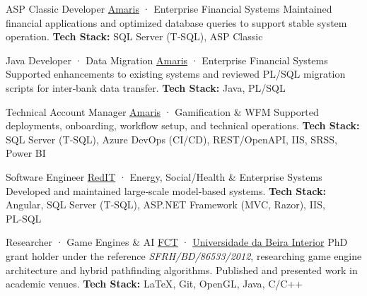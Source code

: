 \documentclass[
	a4paper,
]{fortysecondscv}
\begin{document}
\begin{cvtable}[3]
        {ASP Classic Developer}
        {\href{https://amaris.com/}{Amaris} · Enterprise Financial Systems}
        {Maintained financial applications and optimized database queries to support stable system operation.
         \newline \textbf{Tech Stack:} 
         {\color{sklimegreen}SQL Server (T‑SQL)},
         {\color{skorange}ASP Classic}}

        {Java Developer · Data Migration}
        {\href{https://amaris.com/}{Amaris} · Enterprise Financial Systems}
        {Supported enhancements to existing systems and reviewed PL/SQL migration scripts for inter‑bank data transfer.
         \newline \textbf{Tech Stack:} 
         {\color{skyellow}Java}, 
         {\color{skyellow}PL/SQL}}

        {Technical Account Manager}
        {\href{https://amaris.com/}{Amaris} · Gamification \& WFM}
        {Supported deployments, onboarding, workflow setup, and technical operations.
         \newline \textbf{Tech Stack:} 
         {\color{sklimegreen}SQL Server (T‑SQL)}, 
         {\color{sklimegreen}Azure DevOps (CI/CD)}, 
         {\color{skyellow}REST/OpenAPI},
         {\color{skyellow}IIS}, 
         {\color{skyellow}SRSS, Power BI}}

        {Software Engineer}
        {\href{https://conkord.com/}{RedIT} · Energy, Social/Health \& Enterprise Systems}
        {Developed and maintained large‑scale model‑based systems.
         \newline \textbf{Tech Stack:} 
         {\color{skgreen}Angular}, 
         {\color{sklimegreen}SQL Server (T‑SQL)}, 
         {\color{skyellow}ASP.NET Framework (MVC, Razor), IIS}, 
         {\color{skyellow}PL‑SQL}}

        {Researcher · Game Engines \& AI}
        {\href{https://www.fct.pt/}{FCT} · \href{https://www.ubi.pt/}{Universidade da Beira Interior}}
        {PhD grant holder under the reference 
         \textit{SFRH/BD/86533/2012}, researching game engine architecture and hybrid pathfinding algorithms.
         Published and presented work in academic venues.
         \newline \textbf{Tech Stack:}
         {\color{sklimegreen}LaTeX},
         {\color{sklimegreen}Git},
         {\color{skyellow}OpenGL},
         {\color{skyellow}Java},
         {\color{skorange}C/C++}}    


\end{cvtable}
\end{document}
